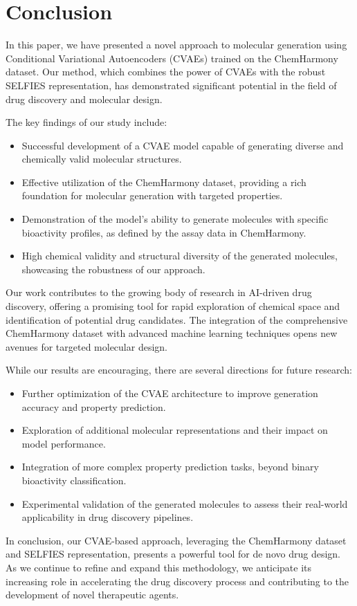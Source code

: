 \section{Conclusion}

In this paper, we have presented a novel approach to molecular generation using Conditional Variational Autoencoders (CVAEs) trained on the ChemHarmony dataset. Our method, which combines the power of CVAEs with the robust SELFIES representation, has demonstrated significant potential in the field of drug discovery and molecular design.

The key findings of our study include:

\begin{itemize}
    \item Successful development of a CVAE model capable of generating diverse and chemically valid molecular structures.
    \item Effective utilization of the ChemHarmony dataset, providing a rich foundation for molecular generation with targeted properties.
    \item Demonstration of the model's ability to generate molecules with specific bioactivity profiles, as defined by the assay data in ChemHarmony.
    \item High chemical validity and structural diversity of the generated molecules, showcasing the robustness of our approach.
\end{itemize}

Our work contributes to the growing body of research in AI-driven drug discovery, offering a promising tool for rapid exploration of chemical space and identification of potential drug candidates. The integration of the comprehensive ChemHarmony dataset with advanced machine learning techniques opens new avenues for targeted molecular design.

While our results are encouraging, there are several directions for future research:

\begin{itemize}
    \item Further optimization of the CVAE architecture to improve generation accuracy and property prediction.
    \item Exploration of additional molecular representations and their impact on model performance.
    \item Integration of more complex property prediction tasks, beyond binary bioactivity classification.
    \item Experimental validation of the generated molecules to assess their real-world applicability in drug discovery pipelines.
\end{itemize}

In conclusion, our CVAE-based approach, leveraging the ChemHarmony dataset and SELFIES representation, presents a powerful tool for de novo drug design. As we continue to refine and expand this methodology, we anticipate its increasing role in accelerating the drug discovery process and contributing to the development of novel therapeutic agents.
